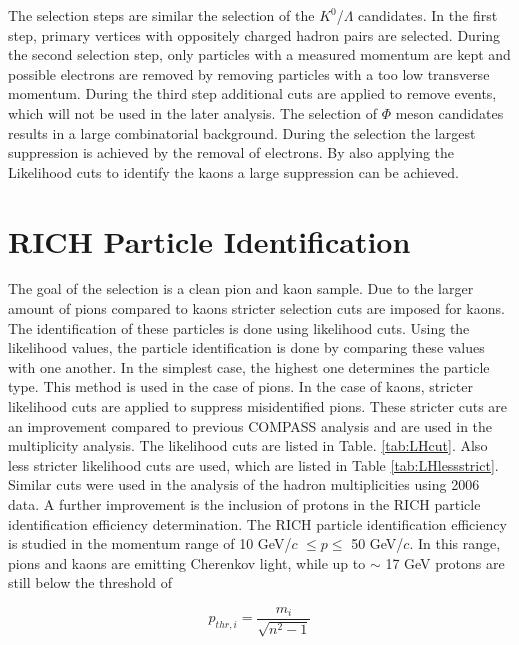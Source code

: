 The selection steps are similar the selection of the $K^0$/$\Lambda$ candidates. In the first step, primary vertices with oppositely charged hadron pairs are selected. During the second selection step, only particles with a measured momentum are kept and possible electrons are removed by removing particles with a too low transverse momentum. During the third step additional cuts are applied to remove events, which will not be used in the later analysis. The selection of $\Phi$ meson candidates results in a large combinatorial background. During the selection the largest suppression is achieved by the removal of electrons. By also applying the Likelihood cuts to identify the kaons a large suppression can be achieved.

\section{RICH Particle Identification}

The goal of the selection is a clean pion and kaon sample. Due to the larger amount of pions compared to kaons stricter selection cuts are imposed for kaons. The identification of these particles is done using likelihood cuts. Using the likelihood values, the particle identification is done by comparing these values with one another. In the simplest case, the highest one determines the particle type. This method is used in the case of pions. In the case of kaons, stricter likelihood cuts are applied to suppress misidentified pions. These stricter cuts are an improvement compared to previous COMPASS analysis and are used in the multiplicity analysis. The likelihood cuts are listed in Table. \ref{tab:LHcut}. Also less stricter likelihood cuts are used, which are listed in Table \ref{tab:LHlessstrict}. Similar cuts were used in the analysis of the hadron multiplicities using 2006 data. A further improvement is the inclusion of protons in the RICH particle identification efficiency determination. The RICH particle identification efficiency is studied in the momentum range of 10 GeV/$c$ $ \leq p \leq $ 50 GeV/$c$. In this range, pions and kaons are emitting Cherenkov light, while up to $\sim$ 17 GeV protons are still below the threshold of

\begin{equation}
  p_{thr,i} = \frac{m_i}{ \sqrt{n^{2}-1} }
\end{equation}

